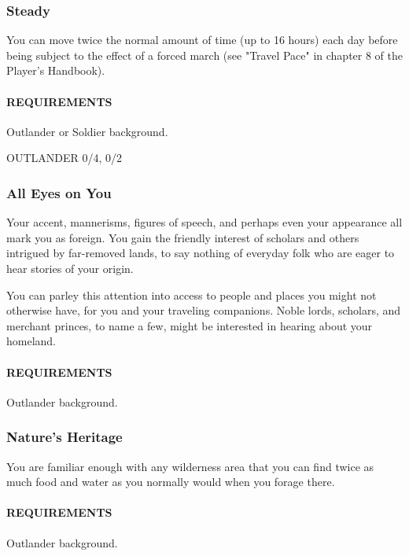     \subsubsection{Steady} \label{feat::steady}
    You can move twice the normal amount of time (up to 16 hours) each day before being subject to the effect of a forced march (see "Travel Pace" in chapter 8 of the Player's Handbook).
    \paragraph{REQUIREMENTS} Outlander or Soldier background.

OUTLANDER 0/4, 0/2
    \subsubsection{All Eyes on You} \label{feat::alleyesonyou}
    Your accent, mannerisms, figures of speech, and perhaps even your appearance all mark you as foreign.
    You gain the friendly interest of scholars and others intrigued by far-removed lands, to say nothing of everyday folk who are eager to hear stories of your origin.

    You can parley this attention into access to people and places you might not otherwise have, for you and your traveling companions.
    Noble lords, scholars, and merchant princes, to name a few, might be interested in hearing about your homeland.
    \paragraph{REQUIREMENTS} Outlander background.

    \subsubsection{Nature's Heritage} \label{feat::naturesheritage}
    You are familiar enough with any wilderness area that you can find twice as much food and water as you normally would when you forage there.
    \paragraph{REQUIREMENTS} Outlander background.


